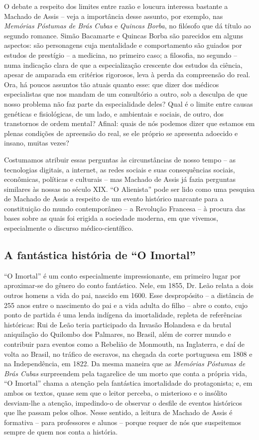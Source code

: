 \documentclass{extarticle}
\begin{document}
O debate a respeito dos limites entre razão e loucura interessa bastante
a Machado de Assis -- veja a importância desse assunto, por exemplo, nas
\emph{Memórias Póstumas de Brás Cubas} e \emph{Quincas Borba}, no
filósofo que dá título ao segundo romance. Simão Bacamarte e Quincas
Borba são parecidos em alguns aspectos: são personagens cuja mentalidade
e comportamento são guiados por estudos de prestígio -- a medicina, no
primeiro caso; a filosofia, no segundo -- numa indicação clara de que a
especialização crescente dos estudos da ciência, apesar de amparada em
critérios rigorosos, leva à perda da compreensão do real. Ora, há poucos
assuntos tão atuais quanto esse: que dizer dos médicos especialistas que
nos mandam de um consultório a outro, sob a desculpa de que nosso
problema não faz parte da especialidade deles? Qual é o limite entre
causas genéticas e fisiológicas, de um lado, e ambientais e sociais, de
outro, dos transtornos de ordem mental? Afinal: quais de nós podemos
dizer que estamos em plenas condições de apreensão do real, se ele
próprio se apresenta adoecido e insano, muitas vezes?

Costumamos atribuir essas perguntas às circunstâncias de nosso tempo --
as tecnologias digitais, a internet, as redes sociais e suas
consequências sociais, econômicas, políticas e culturais -- mas Machado
de Assis já fazia perguntas similares às nossas no século XIX. ``O
Alienista'' pode ser lido como uma pesquisa de Machado de Assis a
respeito de um evento histórico marcante para a constituição do mundo
contemporâneo -- a Revolução Francesa -- à procura das bases sobre as
quais foi erigida a sociedade moderna, em que vivemos, especialmente o
discurso médico-científico.

\subsection{A fantástica história de ``O Imortal''}

``O Imortal'' é um conto especialmente impressionante, em primeiro lugar
por aproximar-se do gênero do conto fantástico. Nele, em 1855, Dr. Leão
relata a dois outros homens a vida do pai, nascido em 1600. Esse
despropósito -- a distância de 255 anos entre o nascimento do pai e a
vida adulta do filho -- abre o conto, cujo ponto de partida é uma lenda
indígena da imortalidade, repleta de referências históricas: Rui de Leão
teria participado da Invasão Holandesa e da brutal aniquilação do
Quilombo dos Palmares, no Brasil, além de correr mundo e contribuir para
eventos como a Rebelião de Monmouth, na Inglaterra, e daí de volta ao
Brasil, no tráfico de escravos, na chegada da corte portuguesa em 1808 e
na Independência, em 1822. Da mesma maneira que as \emph{Memórias
Póstumas de Brás Cubas} surpreendem pela tagarelice de um morto que
conta a própria vida, ``O Imortal'' chama a atenção pela fantástica
imortalidade do protagonista; e, em ambos os textos, quase sem que o
leitor perceba, o misterioso e o insólito desviam-lhe a atenção,
impedindo-o de observar o desfile de eventos históricos que lhe passam
pelos olhos. Nesse sentido, a leitura de Machado de Assis é formativa --
para professores e alunos -- porque requer de nós que suspeitemos sempre
de quem nos conta a história.
\end{document}
